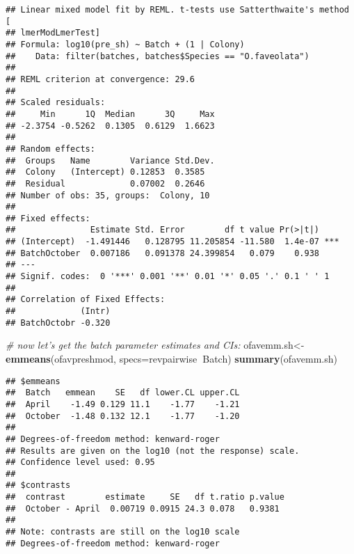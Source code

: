 \documentclass[]{article}
\newenvironment{Shaded}{\begin{snugshade}}{\end{snugshade}}
\newcommand{\CommentTok}[1]{\textcolor[rgb]{0.56,0.35,0.01}{\textit{#1}}}
\newcommand{\DataTypeTok}[1]{\textcolor[rgb]{0.13,0.29,0.53}{#1}}
\newcommand{\KeywordTok}[1]{\textcolor[rgb]{0.13,0.29,0.53}{\textbf{#1}}}
\newcommand{\NormalTok}[1]{#1}
\newcommand{\OperatorTok}[1]{\textcolor[rgb]{0.81,0.36,0.00}{\textbf{#1}}}
\newcommand{\StringTok}[1]{\textcolor[rgb]{0.31,0.60,0.02}{#1}}
\begin{document}
\begin{verbatim}
## Linear mixed model fit by REML. t-tests use Satterthwaite's method [
## lmerModLmerTest]
## Formula: log10(pre_sh) ~ Batch + (1 | Colony)
##    Data: filter(batches, batches$Species == "O.faveolata")
## 
## REML criterion at convergence: 29.6
## 
## Scaled residuals: 
##     Min      1Q  Median      3Q     Max 
## -2.3754 -0.5262  0.1305  0.6129  1.6623 
## 
## Random effects:
##  Groups   Name        Variance Std.Dev.
##  Colony   (Intercept) 0.12853  0.3585  
##  Residual             0.07002  0.2646  
## Number of obs: 35, groups:  Colony, 10
## 
## Fixed effects:
##               Estimate Std. Error        df t value Pr(>|t|)    
## (Intercept)  -1.491446   0.128795 11.205854 -11.580  1.4e-07 ***
## BatchOctober  0.007186   0.091378 24.399854   0.079    0.938    
## ---
## Signif. codes:  0 '***' 0.001 '**' 0.01 '*' 0.05 '.' 0.1 ' ' 1
## 
## Correlation of Fixed Effects:
##             (Intr)
## BatchOctobr -0.320
\end{verbatim}

\begin{Shaded}
\begin{Highlighting}[]
\CommentTok{# now let's get the batch parameter estimates and CIs:}
\NormalTok{ofavemm.sh<-}\StringTok{ }\KeywordTok{emmeans}\NormalTok{(ofavpreshmod, }\DataTypeTok{specs=}\NormalTok{revpairwise}\OperatorTok{~}\NormalTok{Batch) }
\KeywordTok{summary}\NormalTok{(ofavemm.sh)}
\end{Highlighting}
\end{Shaded}

\begin{verbatim}
## $emmeans
##  Batch   emmean    SE   df lower.CL upper.CL
##  April    -1.49 0.129 11.1    -1.77    -1.21
##  October  -1.48 0.132 12.1    -1.77    -1.20
## 
## Degrees-of-freedom method: kenward-roger 
## Results are given on the log10 (not the response) scale. 
## Confidence level used: 0.95 
## 
## $contrasts
##  contrast        estimate     SE   df t.ratio p.value
##  October - April  0.00719 0.0915 24.3 0.078   0.9381 
## 
## Note: contrasts are still on the log10 scale 
## Degrees-of-freedom method: kenward-roger
\end{verbatim}
\end{document}
